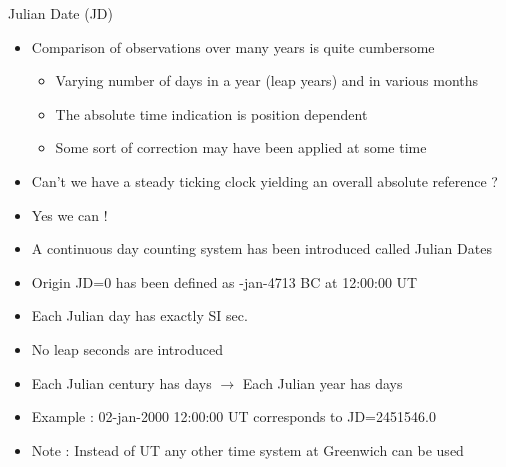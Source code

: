 \Tr
\begin{center}
{\red Julian Date (JD)}
\end{center}
%
\begin{itemize}
\item Comparison of observations over many years is quite cumbersome
\begin{itemize}
\item Varying number of days in a year (leap years) and in various months
\item The absolute time indication is position dependent
\item Some sort of correction may have been applied at some time
\end{itemize}
\item Can't we have a steady ticking clock yielding an overall absolute reference ?
\item[] Yes we can !
\item A {\blue continuous day counting system} has been introduced called {\blue Julian Dates}
\item[] {\blue Origin JD=0} has been defined as {-jan-4713 BC at 12:00:00 UT}
\item[] Each {\blue Julian day} has exactly { SI sec.}
\item[] No leap seconds are introduced
\item[] Each {\blue Julian century} has { days} $\rightarrow$ Each {\blue Julian year} has { days}
\item Example : 02-jan-2000 12:00:00 UT corresponds to JD=2451546.0
\item[] Note : Instead of UT any other time system at Greenwich can be used
\end{itemize}


